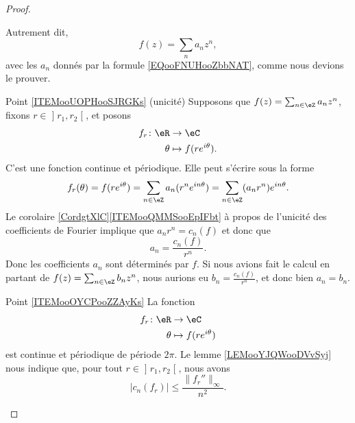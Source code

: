 \begin{proof}
\begin{subproof}
\begin{equation}
			\end{equation}
			Autrement dit,
			\begin{equation}
				f(z)=\sum_na_nz^n,
			\end{equation}
			avec les \( a_n\) donnés par la formule \eqref{EQooFNUHooZbbNAT}, comme nous devions le prouver.
			\item[Point \ref{ITEMooUOPHooSJRGKs} (unicité)]
			Supposons que \( f(z)=\sum_{n\in \eZ}a_nz^n\), fixons \( r\in \mathopen] r_1 , r_2 \mathclose[\), et posons
			\begin{equation}
				\begin{aligned}
					f_r\colon \eR & \to \eC                   \\
					\theta        & \mapsto f(r e^{i\theta}).
				\end{aligned}
			\end{equation}
			C'est une fonction continue et périodique. Elle peut s'écrire sous la forme
			\begin{equation}
				f_r(\theta)=f(r e^{i\theta})=\sum_{n\in \eZ}a_n(r^n e^{in\theta})=\sum_{n\in \eZ}(a_nr^n) e^{in\theta}.
			\end{equation}
			Le corolaire \ref{CordgtXlC}\ref{ITEMooQMMSooEpIFbt} à propos de l'unicité des coefficients de Fourier implique que \( a_nr^n=c_n(f)\) et donc que
			\begin{equation}        \label{EQooBNSMooGLIBqU}
				a_n=\frac{ c_n(f) }{ r^n }.
			\end{equation}
			Donc les coefficients \( a_n\) sont déterminés par \( f\). Si nous avions fait le calcul en partant de \( f(z)=\sum_{n\in \eZ}b_nz^n\), nous aurions eu \( b_n=\frac{ c_n(f) }{ r^n }\), et donc bien \( a_n=b_n\).
			\item[Point \ref{ITEMooOYCPooZZAyKs}]
			La fonction
			\begin{equation}
				\begin{aligned}
					f_r\colon \eR & \to \eC                  \\
					\theta        & \mapsto f(r e^{i\theta})
				\end{aligned}
			\end{equation}
			est continue et périodique de période \( 2\pi\). Le lemme \ref{LEMooYJQWooDVvSyj} nous indique que, pour tout \( r\in \mathopen] r_1 , r_2 \mathclose[\), nous avons
		\begin{equation}        \label{EQooMDNNooPYFQrq}
			| c_n(f_r) |\leq \frac{ \| f_r'' \|_{\infty} }{ n^2 }.
		\end{equation}
		\begin{subproof}

\end{subproof}
\end{subproof}
\end{proof}
